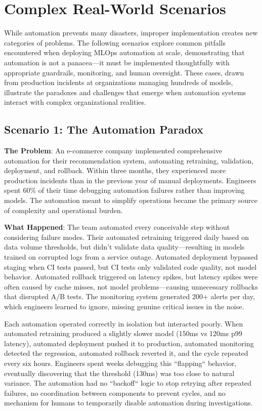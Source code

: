 \section{Complex Real-World Scenarios}

While automation prevents many disasters, improper implementation creates new categories of problems. The following scenarios explore common pitfalls encountered when deploying MLOps automation at scale, demonstrating that automation is not a panacea---it must be implemented thoughtfully with appropriate guardrails, monitoring, and human oversight. These cases, drawn from production incidents at organizations managing hundreds of models, illustrate the paradoxes and challenges that emerge when automation systems interact with complex organizational realities.

\subsection{Scenario 1: The Automation Paradox}

\textbf{The Problem}: An e-commerce company implemented comprehensive automation for their recommendation system, automating retraining, validation, deployment, and rollback. Within three months, they experienced more production incidents than in the previous year of manual deployments. Engineers spent 60\% of their time debugging automation failures rather than improving models. The automation meant to simplify operations became the primary source of complexity and operational burden.

\textbf{What Happened}: The team automated every conceivable step without considering failure modes. Their automated retraining triggered daily based on data volume thresholds, but didn't validate data quality---resulting in models trained on corrupted logs from a service outage. Automated deployment bypassed staging when CI tests passed, but CI tests only validated code quality, not model behavior. Automated rollback triggered on latency spikes, but latency spikes were often caused by cache misses, not model problems---causing unnecessary rollbacks that disrupted A/B tests. The monitoring system generated 200+ alerts per day, which engineers learned to ignore, missing genuine critical issues in the noise.

Each automation operated correctly in isolation but interacted poorly. When automated retraining produced a slightly slower model (150ms vs 120ms p99 latency), automated deployment pushed it to production, automated monitoring detected the regression, automated rollback reverted it, and the cycle repeated every six hours. Engineers spent weeks debugging this ``flapping`` behavior, eventually discovering that the threshold (130ms) was too close to natural variance. The automation had no ``backoff`` logic to stop retrying after repeated failures, no coordination between components to prevent cycles, and no mechanism for humans to temporarily disable automation during investigations.

